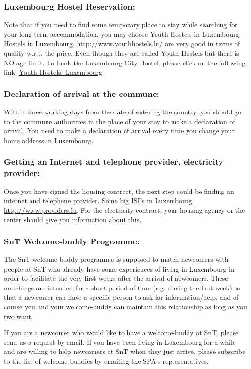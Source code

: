 \subsubsection{Luxembourg Hostel Reservation:} Note that if you need to find some temporary place to stay while searching for your long-term accommodation, you may choose Youth Hostels in Luxembourg. Hostels in Luxembourg, \url{http://www.youthhostels.lu/} are very good in terms of quality w.r.t. the price. Even though they are called Youth Hostels but there is NO age limit.
To book the Luxembourg City-Hostel, please click on the following link: \href{http://youthhostels.lu/en/youth-hostels/youth-hostel-luxembourg}{Youth Hostels: Luxembourg}

\subsubsection{Declaration of arrival at the commune: } Within three working days from the date of entering the country, you should go to the commune authorities in the place of your stay to make a declaration of arrival. 
You need to make a declaration of arrival every time you change your home address in Luxembourg. 

\subsubsection{Getting an Internet and telephone provider, electricity provider:} Once you have signed the housing contract, the next step could be finding an internet and telephone provider. 
Some big ISPs in Luxembourg: \url{http://www.providers.lu}. 
For the electricity contract, your housing agency or the renter should give you information about this. 

\subsubsection{SnT Welcome-buddy Programme:} The SnT welcome-buddy programme is supposed to match newcomers with people at SnT who already have some experiences of living in Luxembourg in order to facilitate the very first weeks after the arrival of newcomers. 
These matchings are intended for a short period of time (e.g. during the first week) so that a newcomer can have a specific person to ask for information/help, and of course you and your welcome-buddy can maintain this relationship as long as you two want. 

If you are a newcomer who would like to have a welcome-buddy at SnT, please send us a request by email. 
If you have been living in Luxembourg for a while and are willing to help newcomers at SnT when they just arrive, please subscribe to the list of welcome-buddies by emailing the SPA's representatives. 

